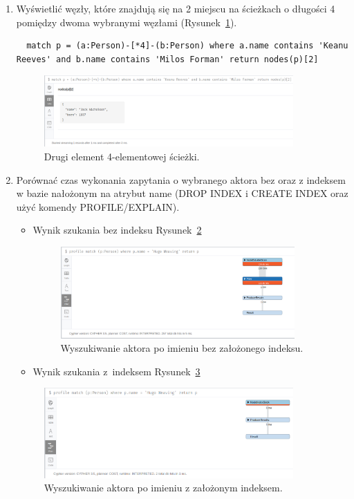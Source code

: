 \documentclass[a4paper,9pt]{extarticle}	%
\begin{document}
\begin{enumerate}
  \item Wyświetlić węzły, które znajdują się na 2 miejscu na ścieżkach o długości 4 pomiędzy dwoma wybranymi węzłami (Rysunek~\ref{scrn:7}).
  \begin{lstlisting}
  match p = (a:Person)-[*4]-(b:Person) where a.name contains 'Keanu Reeves' and b.name contains 'Milos Forman' return nodes(p)[2]
  \end{lstlisting}
  \begin{figure}[ht]
    \centering
    \includegraphics[width=0.9\textwidth]{screeny/7.png}
    \caption{Drugi element 4-elementowej ścieżki.}
    \label{scrn:7}
  \end{figure}
\newpage
  \item Porównać czas wykonania zapytania o wybranego aktora bez oraz z indeksem w bazie nałożonym na atrybut name (DROP INDEX i CREATE INDEX oraz użyć komendy PROFILE/EXPLAIN).
  \begin{itemize}
  \item Wynik szukania bez indeksu \ppauza Rysunek~\ref{scrn:8a}
   \begin{figure}[ht]
    \centering
    \includegraphics[width=0.9\textwidth]{screeny/8a.png}
    \caption{Wyszukiwanie aktora po imieniu bez założonego indeksu.}
    \label{scrn:8a}
  \end{figure}
  \item Wynik szukania z~indeksem \ppauza Rysunek~\ref{scrn:8b}
  \end{itemize}
  \begin{figure}[ht]
    \centering
    \includegraphics[width=0.9\textwidth]{screeny/8b.png}
    \caption{Wyszukiwanie aktora po imieniu z założonym indeksem.}
    \label{scrn:8b}
  \end{figure}


\end{enumerate}
\end{document}
